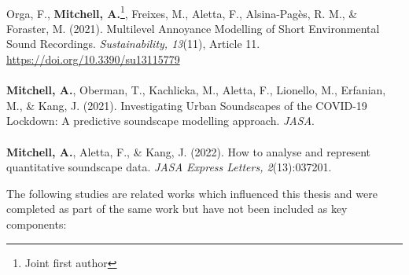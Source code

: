 \documentclass[twoside,fontsize=12pt,titlepage,chapterprefix=true
]{scrbook}
\begin{document}
\paragraph*{}
Orga, F., \textbf{Mitchell, A.}\footnote{Joint first author}, Freixes, M., Aletta, F., Alsina-Pagès, R. M., \& Foraster, M. (2021). Multilevel Annoyance Modelling of Short Environmental Sound Recordings. \emph{Sustainability, 13}(11), Article 11. \url{https://doi.org/10.3390/su13115779}

\paragraph*{}
\textbf{Mitchell, A.}, Oberman, T., Kachlicka, M., Aletta, F., Lionello, M., Erfanian, M., \& Kang, J. (2021). Investigating Urban Soundscapes of the COVID-19 Lockdown: A predictive soundscape modelling approach. \emph{JASA}.


\paragraph*{}
\textbf{Mitchell, A.}, Aletta, F., \& Kang, J. (2022). How to analyse and represent quantitative soundscape data. \emph{JASA Express Letters, 2}(13):037201.




\newpage
The following studies are related works which influenced this thesis and were completed as part of the same work but have not been included as key components:

\end{document}

